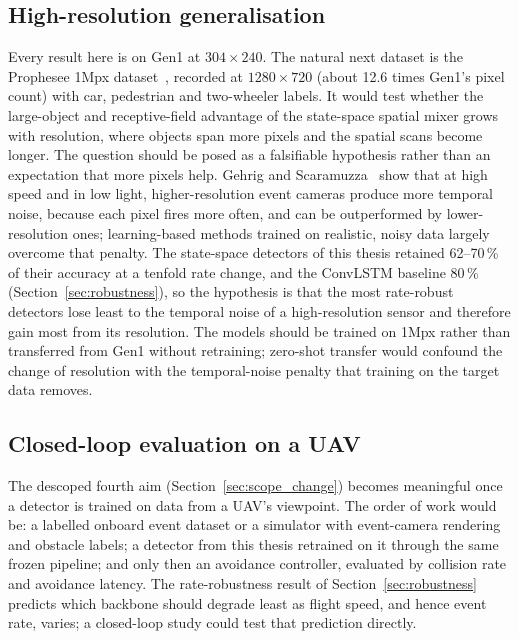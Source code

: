 \documentclass[11pt, a4paper]{report}
\begin{document}
\subsection{High-resolution generalisation}
Every result here is on Gen1 at $304\times240$. The natural next dataset is the Prophesee 1Mpx
dataset~\cite{perot2020learning}, recorded at $1280\times720$ (about 12.6 times Gen1's pixel count) with
car, pedestrian and two-wheeler labels. It would test whether the large-object and receptive-field
advantage of the state-space spatial mixer grows with resolution, where objects span more pixels and the
spatial scans become longer. The question should be posed as a falsifiable hypothesis rather than an
expectation that more pixels help. Gehrig and Scaramuzza~\cite{gehrig2022high} show that at high speed and
in low light, higher-resolution event cameras produce more temporal noise, because each pixel fires more
often, and can be outperformed by lower-resolution ones; learning-based methods trained on realistic,
noisy data largely overcome that penalty. The state-space detectors of this thesis retained 62--70\,\% of
their accuracy at a tenfold rate change, and the ConvLSTM baseline 80\,\% (Section~\ref{sec:robustness}),
so the hypothesis is that the most rate-robust detectors lose least to the temporal noise of a
high-resolution sensor and therefore gain most from its resolution.
The models should be trained on 1Mpx rather than transferred from Gen1 without retraining; zero-shot
transfer would confound the change of resolution with the temporal-noise penalty that training on the
target data removes.

\subsection{Closed-loop evaluation on a UAV}
\label{subsec:fw_closed_loop}
The descoped fourth aim (Section~\ref{sec:scope_change}) becomes meaningful once a detector is trained on
data from a UAV's viewpoint. The order of work would be: a labelled onboard event dataset or a simulator
with event-camera rendering and obstacle labels; a detector from this thesis retrained on it through the
same frozen pipeline; and only then an avoidance controller, evaluated by collision rate and avoidance
latency. The rate-robustness result of Section~\ref{sec:robustness} predicts which backbone should degrade
least as flight speed, and hence event rate, varies; a closed-loop study could test that prediction
directly.
\end{document}
